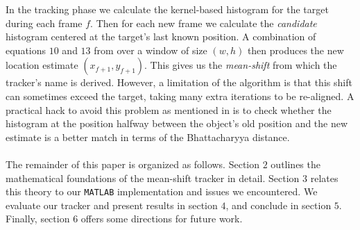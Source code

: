 \documentclass[a4paper,11pt]{article}
\begin{document}
		In the tracking phase we calculate the kernel-based histogram for the target during
		each frame $f$. Then for each new frame we calculate the \textit{candidate} histogram
		centered at the target's last known position. A combination of equations $10$ and $13$
		from \cite{KBOT} over a window of size $(w, h)$ then produces the new location estimate
		$(x_{f+1}, y_{f+1})$. This gives us the \textit{mean-shift} from which the tracker's name
		is derived. However, a limitation of the algorithm is that this shift can sometimes exceed
		the target, taking many extra iterations to be re-aligned. A practical hack to avoid this
		problem as mentioned in \cite{KBOT} is to check whether the histogram at the position halfway
		between the object's old position and the new estimate is a better match in terms of the
		Bhattacharyya distance.
		\\ \\
		The remainder of this paper is organized as follows. Section $2$ outlines the mathematical
		foundations of the mean-shift tracker in detail. Section $3$ relates this theory to our
		\verb|MATLAB| implementation and issues we encountered. We evaluate our tracker and present
		results in section $4$, and conclude in section $5$. Finally, section $6$ offers some directions
		for future work.
\end{document}
